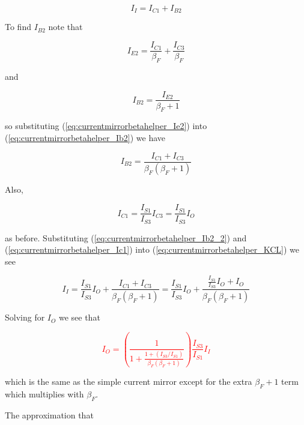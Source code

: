 \begin{equation}
I_{I} = I_{C1} + I_{B2}
\label{eq:currentmirrorbetahelper_KCL}
\end{equation}

To find $I_{B2}$ note that

\begin{equation}
I_{E2} = \frac{I_{C1}}{\beta_{F}} + \frac{I_{C3}}{\beta_{F}}
\label{eq:currentmirrorbetahelper_Ie2}
\end{equation}

and

\begin{equation}
I_{B2} = \frac{I_{E2}}{\beta_{F} + 1}
\label{eq:currentmirrorbetahelper_Ib2}
\end{equation}

so substituting (\ref{eq:currentmirrorbetahelper_Ie2}) into (\ref{eq:currentmirrorbetahelper_Ib2}) we have

\begin{equation}
I_{B2} = \frac{I_{C1} + I_{C3}}{\beta_{F}(\beta_{F} + 1)}
\label{eq:currentmirrorbetahelper_Ib2_2}
\end{equation}

Also,

\begin{equation}
I_{C1} = \frac{I_{S1}}{I_{S3}}I_{C3} = \frac{I_{S1}}{I_{S3}}I_{O}
\label{eq:currentmirrorbetahelper_Ic1}
\end{equation}

as before. Substituting (\ref{eq:currentmirrorbetahelper_Ib2_2}) and (\ref{eq:currentmirrorbetahelper_Ic1}) into (\ref{eq:currentmirrorbetahelper_KCL}) we see

\begin{equation}
I_{I} = \frac{I_{S1}}{I_{S3}}I_{O} + \frac{I_{C1} + I_{C3}}{\beta_{F}(\beta_{F} + 1)} = \frac{I_{S1}}{I_{S3}}I_{O} + \frac{\frac{I_{S1}}{I_{S3}}I_{O} + I_{O}}{\beta_{F}(\beta_{F} + 1)}
\end{equation}

Solving for $I_{O}$ we see that

\textcolor{red}{
\begin{equation}
I_{O} = \left(\frac{1}{1 + \frac{1 + (I_{S3}/I_{S1})}{\beta_{F}(\beta_{F} + 1)}}\right)\frac{I_{S3}}{I_{S1}}I_{I}
\label{eq:currentmirrorbetahelper}
\end{equation}
}

which is the same as the simple current mirror except for the extra $\beta_{F} + 1$ term which multiplies with $\beta_{F}$.
\par
The approximation that

